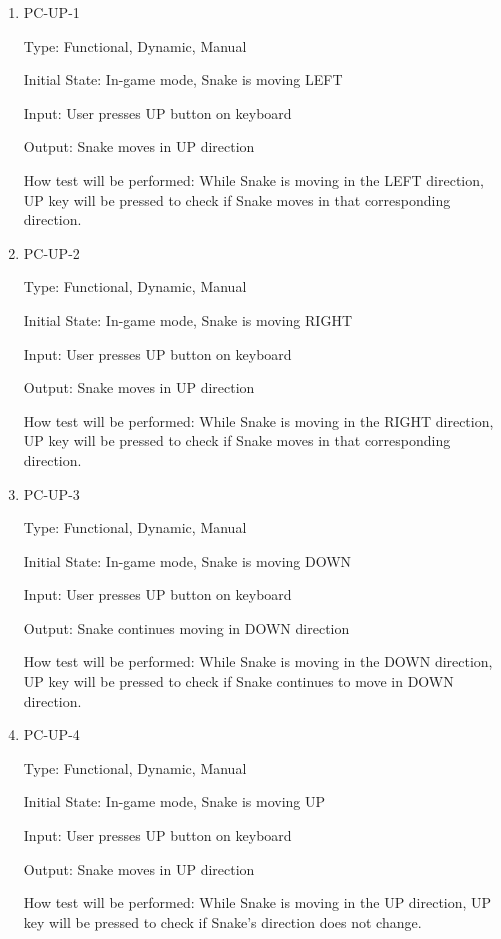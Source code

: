 \documentclass[12pt, titlepage]{article}
\begin{document}
\begin{enumerate}

\item{PC-UP-1}
\label{pc-up-1}

Type: Functional, Dynamic, Manual

Initial State: In-game mode, Snake is moving LEFT

Input: User presses UP button on keyboard

Output: Snake moves in UP direction

How test will be performed: While Snake is moving in the LEFT direction, UP key will be pressed to check if Snake moves in that corresponding direction. 

\item{PC-UP-2}
\label{pc-up-2}

Type: Functional, Dynamic, Manual

Initial State: In-game mode, Snake is moving RIGHT

Input: User presses UP button on keyboard

Output: Snake moves in UP direction

How test will be performed: While Snake is moving in the RIGHT direction, UP key will be pressed to check if Snake moves in that corresponding direction. 

\item{PC-UP-3}
\label{pc-up-3}

Type: Functional, Dynamic, Manual

Initial State: In-game mode, Snake is moving DOWN

Input: User presses UP button on keyboard

Output: Snake continues moving in DOWN direction

How test will be performed: While Snake is moving in the DOWN direction, UP key will be pressed to check if Snake continues to move in DOWN direction. 

\item{PC-UP-4}
\label{pc-up-4}

Type: Functional, Dynamic, Manual

Initial State: In-game mode, Snake is moving UP

Input: User presses UP button on keyboard

Output: Snake moves in UP direction

How test will be performed: While Snake is moving in the UP direction, UP key will be pressed to check if Snake's direction does not change.


\end{enumerate}
\end{document}
